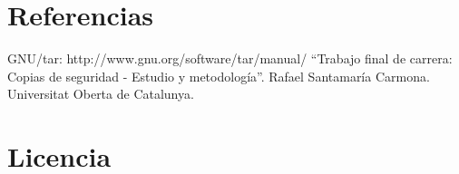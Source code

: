 \documentclass[12pt]{article}
\begin{document}
%	
%		
%


\section*{Referencias}

GNU/tar: http://www.gnu.org/software/tar/manual/
``Trabajo final de carrera: Copias de seguridad - Estudio y metodología''.
Rafael Santamaría Carmona. Universitat Oberta de Catalunya.

\section*{Licencia}
\end{document}
